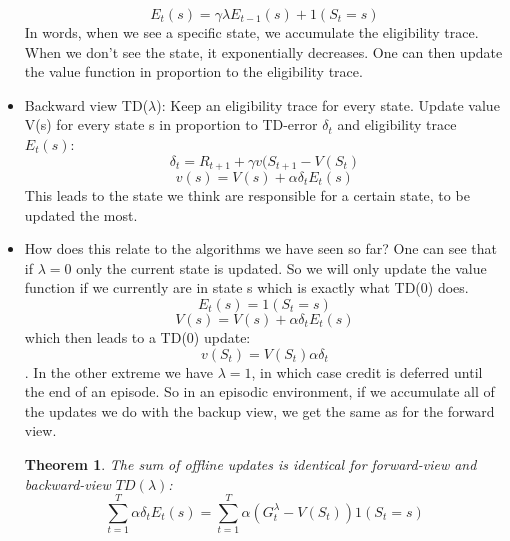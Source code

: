 \documentclass[a4paper]{article}
\newtheorem{theorem}{Theorem}
\begin{document}
\begin{itemize}
    $$E_t(s) = \gamma \lambda E_{t-1}(s) + 1(S_t=s)$$
    \newline
    In words, when we see a specific state, we accumulate the eligibility trace. When we don't see the state, it exponentially decreases. One can then update the value function in proportion to the eligibility trace. 
    \item Backward view TD($\lambda$): Keep an eligibility trace for every state. Update value V(s) for every state s in proportion to TD-error $\delta_t$ and eligibility trace $E_t(s)$:
    $$\delta_t = R_{t+1} + \gamma v(S_{t+1} - V(S_t)$$
    $$ v(s) = V(s) + \alpha \delta_t E_t(s)$$
    This leads to the state we think are responsible for a certain state, to be updated the most. 
    \item How does this relate to the algorithms we have seen so far? One can see that if $\lambda = 0$ only the current state is updated. So we will only update the value function if we currently are in state s which is exactly what TD(0) does. 
    $$ E_t(s) = 1(S_t = s) $$$$V(s) = V(s) + \alpha \delta_t E_t(s)$$ which then leads to a TD(0) update: $$v(S_t) = V(S_t)  \alpha \delta_t$$.
    \newline In the other extreme we have $\lambda = 1$, in which case credit is deferred until the end of an episode. So in an episodic environment, if we accumulate all of the updates we do with the backup view, we get the same as for the forward view. 
    \begin{theorem}
    The sum of offline updates is identical for forward-view and backward-view $TD(\lambda)$: $$\sum_{t=1}^T \alpha \delta_t E_t(s) = \sum_{t=1}^T \alpha(G_t^{\lambda} - V(S_t))1(S_t=s)$$
    \end{theorem}
\end{itemize}
\end{document}
